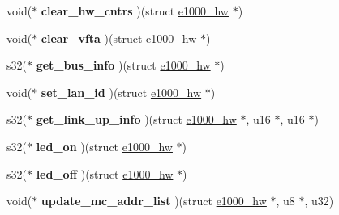\begin{DoxyCompactItemize}
\item 
\hypertarget{structe1000__mac__operations_af323960efbd79346fd51db93b099fba9}{
void($\ast$ {\bfseries clear\_\-hw\_\-cntrs} )(struct \hyperlink{structe1000__hw}{e1000\_\-hw} $\ast$)}
\label{structe1000__mac__operations_af323960efbd79346fd51db93b099fba9}

\item 
\hypertarget{structe1000__mac__operations_a4c933d8f17c0d408c3ecb7ad5150d82d}{
void($\ast$ {\bfseries clear\_\-vfta} )(struct \hyperlink{structe1000__hw}{e1000\_\-hw} $\ast$)}
\label{structe1000__mac__operations_a4c933d8f17c0d408c3ecb7ad5150d82d}

\item 
\hypertarget{structe1000__mac__operations_ae7e1ceb0d970e0daecf676a84ddd75e2}{
s32($\ast$ {\bfseries get\_\-bus\_\-info} )(struct \hyperlink{structe1000__hw}{e1000\_\-hw} $\ast$)}
\label{structe1000__mac__operations_ae7e1ceb0d970e0daecf676a84ddd75e2}

\item 
\hypertarget{structe1000__mac__operations_a6ef7ce962a8878908d8d1270e3c5cbbf}{
void($\ast$ {\bfseries set\_\-lan\_\-id} )(struct \hyperlink{structe1000__hw}{e1000\_\-hw} $\ast$)}
\label{structe1000__mac__operations_a6ef7ce962a8878908d8d1270e3c5cbbf}

\item 
\hypertarget{structe1000__mac__operations_a1b4f20f8162f202b0bbe52225b8323a0}{
s32($\ast$ {\bfseries get\_\-link\_\-up\_\-info} )(struct \hyperlink{structe1000__hw}{e1000\_\-hw} $\ast$, u16 $\ast$, u16 $\ast$)}
\label{structe1000__mac__operations_a1b4f20f8162f202b0bbe52225b8323a0}

\item 
\hypertarget{structe1000__mac__operations_a0bca6cf49457133a6555486f8bf48cbb}{
s32($\ast$ {\bfseries led\_\-on} )(struct \hyperlink{structe1000__hw}{e1000\_\-hw} $\ast$)}
\label{structe1000__mac__operations_a0bca6cf49457133a6555486f8bf48cbb}

\item 
\hypertarget{structe1000__mac__operations_aa98870f5fe587c1048c3d5ad48aea208}{
s32($\ast$ {\bfseries led\_\-off} )(struct \hyperlink{structe1000__hw}{e1000\_\-hw} $\ast$)}
\label{structe1000__mac__operations_aa98870f5fe587c1048c3d5ad48aea208}

\item 
\hypertarget{structe1000__mac__operations_ae16008d470719dd8701b7a283d53c4c9}{
void($\ast$ {\bfseries update\_\-mc\_\-addr\_\-list} )(struct \hyperlink{structe1000__hw}{e1000\_\-hw} $\ast$, u8 $\ast$, u32)}
\label{structe1000__mac__operations_ae16008d470719dd8701b7a283d53c4c9}


\end{DoxyCompactItemize}
